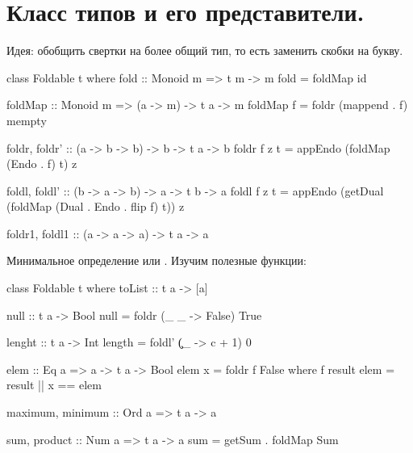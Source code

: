 \documentclass[11pt,a4paper]{article}
\begin{document}
\section{Класс типов  и его представители.}
Идея: обобщить свертки на более общий тип, то есть  заменить скобки на букву.
\begin{hscode}
class Foldable t where
  fold :: Monoid m => t m -> m
  fold = foldMap id

  foldMap :: Monoid m => (a -> m) -> t a -> m
  foldMap f = foldr (mappend . f) mempty

  foldr, foldr' :: (a -> b -> b) -> b -> t a -> b
  foldr f z t = appEndo (foldMap (Endo . f) t) z

  foldl, foldl' :: (b -> a -> b) -> a -> t b -> a
  foldl f z t = appEndo (getDual (foldMap (Dual . Endo . flip f) t)) z

  foldr1, foldl1 :: (a -> a -> a) -> t a -> a
\end{hscode}
Минимальное определение  или  .
Изучим  полезные функции:
\begin{hscode}
class Foldable t where
  toList :: t a -> [a]

  null :: t a -> Bool
  null = foldr (\_ _ -> False) True

  lenght :: t a -> Int
  length = foldl' (\c _ -> c + 1) 0

  elem :: Eq a => a -> t a -> Bool
  elem x = foldr f False
             where f result elem = result || x == elem 
  
  maximum, minimum :: Ord a => t a -> a

  sum, product :: Num a => t a -> a
  sum = getSum . foldMap Sum
\end{hscode}
\end{document}
